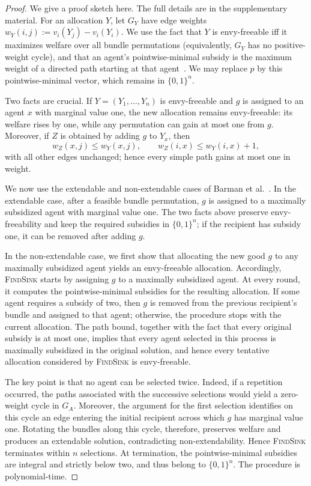 \documentclass[sigconf,anonymous]{aamas}
\theoremstyle{acmplain}
\theoremstyle{acmdefinition}
\theoremstyle{acmplain}
\begin{document}
\begin{proof}
We give a proof sketch here. The full details are in the supplementary material. For an allocation $Y$, let $G_Y$ have edge weights $w_Y(i,j):=v_i(Y_j)-v_i(Y_i)$. We use the fact that $Y$ is envy-freeable iff it maximizes welfare over all bundle permutations (equivalently, $G_Y$ has no positive-weight cycle), and that an agent's pointwise-minimal subsidy is the maximum weight of a directed path starting at that agent~\cite{HS19}. We may replace $p$ by this pointwise-minimal vector, which remains in $\{0,1\}^n$.

Two facts are crucial. If $Y=(Y_1,\ldots,Y_n)$ is envy-freeable and $g$ is assigned to an agent $x$ with marginal value one, the new allocation remains envy-freeable: its welfare rises by one, while any permutation can gain at most one from $g$. Moreover, if $Z$ is obtained by adding $g$ to $Y_x$, then
\[
w_Z(x,j)\leq w_Y(x,j),\qquad w_Z(i,x)\leq w_Y(i,x)+1,
\]
with all other edges unchanged; hence every simple path gains at most one in weight.

We now use the extendable and non-extendable cases of Barman et al.~\cite{BKNS22}. In the extendable case, after a feasible bundle permutation, $g$ is assigned to a maximally subsidized agent with marginal value one. The two facts above preserve envy-freeability and keep the required subsidies in $\{0,1\}^n$; if the recipient has subsidy one, it can be removed after adding $g$.

In the non-extendable case, we first show that allocating the new good $g$ to any maximally subsidized agent yields an envy-freeable allocation. Accordingly, \textsc{FindSink} starts by assigning $g$ to a maximally subsidized agent. At every round, it computes the pointwise-minimal subsidies for the resulting allocation. If some agent requires a subsidy of two, then $g$ is removed from the previous recipient's bundle and assigned to that agent; otherwise, the procedure stops with the current allocation. The path bound, together with the fact that every original subsidy is at most one, implies that every agent selected in this process is maximally subsidized in the original solution, and hence every tentative allocation considered by \textsc{FindSink} is envy-freeable.

The key point is that no agent can be selected twice. Indeed, if a repetition occurred, the paths associated with the successive selections would yield a zero-weight cycle in $G_A$. Moreover, the argument for the first selection identifies on this cycle an edge entering the initial recipient across which $g$ has marginal value one. Rotating the bundles along this cycle, therefore, preserves welfare and produces an extendable solution, contradicting non-extendability. Hence \textsc{FindSink} terminates within $n$ selections. At termination, the pointwise-minimal subsidies are integral and strictly below two, and thus belong to $\{0,1\}^n$. The procedure is polynomial-time.
\end{proof}
\end{document}
